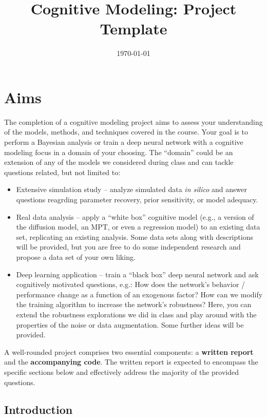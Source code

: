 \documentclass{article}
\title{Cognitive Modeling: Project Template}
\date\today
\begin{document}
\maketitle



\section*{Aims}

The completion of a cognitive modeling project aims to assess your understanding of the models, methods, and techniques covered in the course.
Your goal is to perform a Bayesian analysis or train a deep neural network with a cognitive modeling focus in a domain of your choosing. 
The ``domain'' could be an extension of any of the models we considered during class and can tackle questions related, but not limited to:
\begin{itemize}
    \item Extensive simulation study -- analyze simulated data \textit{in silico} and answer questions reagrding parameter recovery, prior sensitivity, or model adequacy.
    \item Real data analysis -- apply a ``white box'' cognitive model (e.g., a version of the diffusion model, an MPT, or even a regression model) to an existing data set, replicating an existing analysis. Some data sets along with descriptions will be provided, but you are free to do some independent research and propose a data set of your own liking.
    \item Deep learning application -- train a ``black box'' deep neural network and ask cognitively motivated questions, e.g.: How does the network's behavior / performance change as a function of an exogenous factor? How can we modify the training algorithm to increase the network's robustness? Here, you can extend the robustness explorations we did in class and play around with the properties of the noise or data augmentation. Some further ideas will be provided.
\end{itemize}

\noindent A well-rounded project comprises two essential components: a \textbf{written report} and the \textbf{accompanying code}. The written report is expected to encompass the specific sections below and effectively address the majority of the provided questions.

\subsection*{Introduction}
\end{document}
